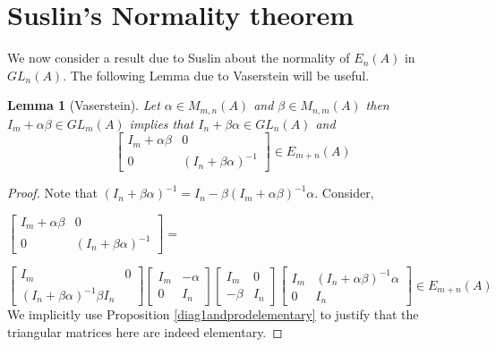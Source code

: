 \documentclass[12pt]{report}
\numberwithin{equation}{section}
\newcounter{dummy} \numberwithin{dummy}{section}
\newtheorem{lemma}[dummy]{Lemma}
\begin{document}
	\section{Suslin's Normality theorem}
		We now consider a result due to Suslin about the normality of $E_n(A) $ in $GL_n(A)$. The following Lemma due to Vaserstein will be useful.
		\begin{lemma}[Vaserstein]\label{vasersteinlem}
			Let $\alpha \in M_{m,n} (A)$ and $\beta \in M_{n,m}(A)$ then $I_m+\alpha \beta \in GL_m(A)$ implies that $I_n+\beta \alpha \in GL_n(A)$ and \[ \begin{bmatrix}
				I_m+\alpha \beta & 0 \\ 0 & (I_n+\beta \alpha)^{-1}
			\end{bmatrix} \in E_{m+n} (A)\] 
		\end{lemma}
		\begin{proof}
			Note that $(I_n+\beta \alpha )^{-1}=I_n-\beta (I_m+\alpha \beta )^{-1} \alpha$. Consider,

			\( \begin{bmatrix}
				I_m+\alpha \beta & 0 \\ 0 & (I_n+\beta \alpha)^{-1}
			\end{bmatrix} =
			\)
			
			
			\(\begin{bmatrix}
			I_m & 0 \\
			(I_n+\beta \alpha )^{-1}\beta I_n
			\end{bmatrix}\begin{bmatrix}
			I_m & -\alpha \\
			0 & I_n
			\end{bmatrix} \begin{bmatrix}
			I_m & 0\\
			-\beta  & I_n
			\end{bmatrix} \begin{bmatrix}
			I_m & (I_n+\alpha \beta )^{-1} \alpha \\
			0 & I_n
			\end{bmatrix}\in E_{m+n} (A)\) 
			We implicitly use Proposition \ref{diag1andprodelementary} to justify that the triangular matrices here are indeed elementary.
		\end{proof}
		
\end{document}
